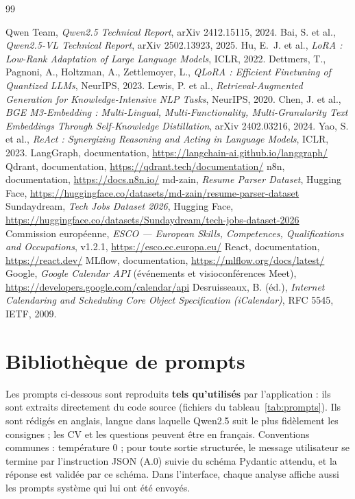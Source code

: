 \documentclass[11pt,a4paper]{report}
\begin{document}
\begin{thebibliography}{99}
 Qwen Team, \emph{Qwen2.5 Technical Report}, arXiv 2412.15115, 2024.
 Bai, S. et al., \emph{Qwen2.5-VL Technical Report}, arXiv 2502.13923, 2025.
 Hu, E.~J. et al., \emph{LoRA : Low-Rank Adaptation of Large Language Models}, ICLR, 2022.
 Dettmers, T., Pagnoni, A., Holtzman, A., Zettlemoyer, L., \emph{QLoRA : Efficient Finetuning of Quantized LLMs}, NeurIPS, 2023.
 Lewis, P. et al., \emph{Retrieval-Augmented Generation for Knowledge-Intensive NLP Tasks}, NeurIPS, 2020.
 Chen, J. et al., \emph{BGE M3-Embedding : Multi-Lingual, Multi-Functionality, Multi-Granularity Text Embeddings Through Self-Knowledge Distillation}, arXiv 2402.03216, 2024.
 Yao, S. et al., \emph{ReAct : Synergizing Reasoning and Acting in Language Models}, ICLR, 2023.
 LangGraph, documentation, \url{https://langchain-ai.github.io/langgraph/}
 Qdrant, documentation, \url{https://qdrant.tech/documentation/}
 n8n, documentation, \url{https://docs.n8n.io/}
 md-zain, \emph{Resume Parser Dataset}, Hugging Face, \url{https://huggingface.co/datasets/md-zain/resume-parser-dataset}
 Sundaydream, \emph{Tech Jobs Dataset 2026}, Hugging Face, \url{https://huggingface.co/datasets/Sundaydream/tech-jobs-dataset-2026}
 Commission européenne, \emph{ESCO --- European Skills, Competences, Qualifications and Occupations}, v1.2.1, \url{https://esco.ec.europa.eu/}
 React, documentation, \url{https://react.dev/}
 MLflow, documentation, \url{https://mlflow.org/docs/latest/}
 Google, \emph{Google Calendar API} (événements et visioconférences Meet), \url{https://developers.google.com/calendar/api}
 Desruisseaux, B. (éd.), \emph{Internet Calendaring and Scheduling Core Object Specification (iCalendar)}, RFC 5545, IETF, 2009.
\end{thebibliography}

\appendix
\chapter{Bibliothèque de prompts}

Les prompts ci-dessous sont reproduits \textbf{tels qu'utilisés} par l'application : ils sont extraits directement du code source (fichiers du tableau~\ref{tab:prompts}). Ils sont rédigés en anglais, langue dans laquelle Qwen2.5 suit le plus fidèlement les consignes ; les CV et les questions peuvent être en français. Conventions communes : température 0 ; pour toute sortie structurée, le message utilisateur se termine par l'instruction JSON (A.0) suivie du schéma Pydantic attendu, et la réponse est validée par ce schéma. Dans l'interface, chaque analyse affiche aussi les prompts système qui lui ont été envoyés.
\end{document}
